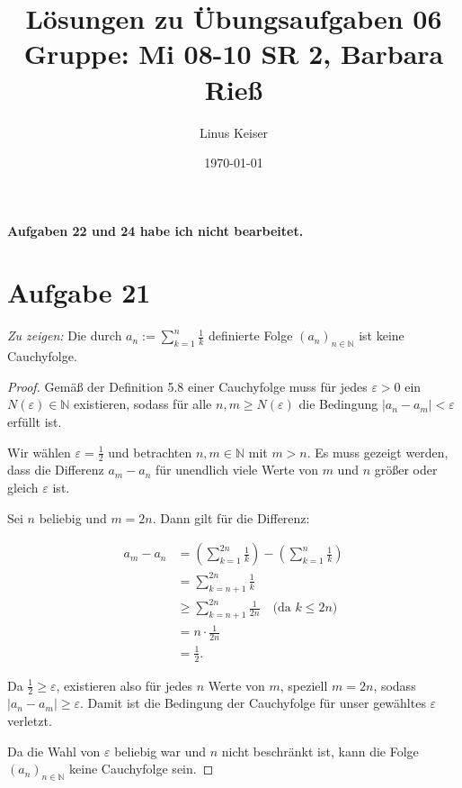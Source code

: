 \documentclass{article}
\title{Lösungen zu Übungsaufgaben 06 \\ \small Gruppe: Mi 08-10 SR 2, Barbara Rieß}
\author{Linus Keiser}
\date{\today}
\theoremstyle{definition}
\theoremstyle{remark}
\begin{document}
\maketitle

\paragraph{Aufgaben 22 und 24 habe ich nicht bearbeitet.}

\section*{Aufgabe 21}

\textit{Zu zeigen:} Die durch \( a_n := \sum_{k=1}^{n} \frac{1}{k} \) definierte Folge \((a_n)_{n\in\mathbb{N}}\) ist keine Cauchyfolge.

\begin{proof}
	Gemäß der Definition 5.8 einer Cauchyfolge muss für jedes \(\varepsilon > 0\) ein \(N(\varepsilon) \in \mathbb{N}\) existieren, sodass für alle \(n, m \geq N(\varepsilon)\) die Bedingung \(|a_n - a_m| < \varepsilon\) erfüllt ist.

	Wir wählen \(\varepsilon = \frac{1}{2}\) und betrachten \(n, m \in \mathbb{N}\) mit \(m > n\). Es muss gezeigt werden, dass die Differenz \(a_m - a_n\) für unendlich viele Werte von \(m\) und \(n\) größer oder gleich \(\varepsilon\) ist.

	Sei \(n\) beliebig und \(m = 2n\). Dann gilt für die Differenz:

	\begin{align*}
		a_m - a_n & = \left( \sum_{k=1}^{2n} \frac{1}{k} \right) - \left( \sum_{k=1}^{n} \frac{1}{k} \right) \\
		          & = \sum_{k=n+1}^{2n} \frac{1}{k}                                                          \\
		          & \geq \sum_{k=n+1}^{2n} \frac{1}{2n} \quad \text{(da \(k \leq 2n\))}                      \\
		          & = n \cdot \frac{1}{2n}                                                                   \\
		          & = \frac{1}{2}.
	\end{align*}

	Da \(\frac{1}{2} \geq \varepsilon\), existieren also für jedes \(n\) Werte von \(m\), speziell \(m = 2n\), sodass \(|a_n - a_m| \geq \varepsilon\). Damit ist die Bedingung der Cauchyfolge für unser gewähltes \(\varepsilon\) verletzt.

	Da die Wahl von \(\varepsilon\) beliebig war und \(n\) nicht beschränkt ist, kann die Folge \((a_n)_{n\in\mathbb{N}}\) keine Cauchyfolge sein.
\end{proof}
\end{document}
